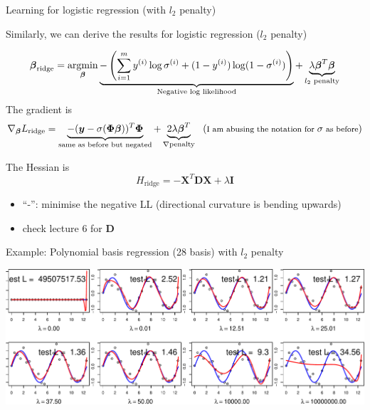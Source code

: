 \documentclass[ignorenonframetext,aspectratio=169]{beamer}
\providecommand{\tightlist}{%
  \setlength{\itemsep}{0pt}\setlength{\parskip}{0pt}}
\newcommand{\vv}[1]{\boldsymbol{#1}}
\newcommand{\argmin}{\operatornamewithlimits{argmin}}
\newcommand{\dd}[1]{\ensuremath{ #1^{(i)}}}
\begin{document}
\begin{frame}{Learning for logistic regression (with \(l_2\) penalty)}
\protect\hypertarget{learning-for-logistic-regression-with-l_2-penalty}{}

Similarly, we can derive the results for logistic regression (\(l_2\)
penalty)

\[\vv{\beta}_{\text{ridge}}=\argmin_{{\vv{\beta}}} \underbrace{-\left(\sum_{i=1}^m  \dd{y} \log \sigma^{(i)}+(1-\dd{y}) \log (1-\sigma^{(i)})\right )}_{\text{Negative log likelihood}} + \underbrace{\lambda \vv{\beta}^T\vv{\beta}}_{l_2 \text{ penalty}}\]
The gradient is
\[\nabla_{\vv{\beta}} L_{\text{ridge}} = \underbrace{-(\vv{y}-\sigma(\vv{\Phi\beta}))^T\vv{\Phi}}_{\text{same as before but negated}} + \underbrace{2\lambda \vv{\beta}^T}_{\nabla\text{penalty}} \;\;\; \footnotesize (\text{I am abusing the notation for } \sigma \text{ as before})\]

The Hessian is
\[H_{\text{ridge}} = -\vv{X}^T\vv{D}\vv{X}+\lambda\vv{I}\]

\begin{itemize}
\tightlist
\item
  ``-'': minimise the negative LL (directional curvature is bending
  upwards)
\item
  check lecture 6 for \(\vv{D}\)
\end{itemize}

\end{frame}

\begin{frame}{Example: Polynomial basis regression (28 basis) with
\(l_2\) penalty}
\protect\hypertarget{example-polynomial-basis-regression-28-basis-with-l_2-penalty}{}

\begin{center}\includegraphics[width=1\linewidth]{lecture10_files/figure-beamer/unnamed-chunk-20-1} \end{center}

\end{frame}
\end{document}
